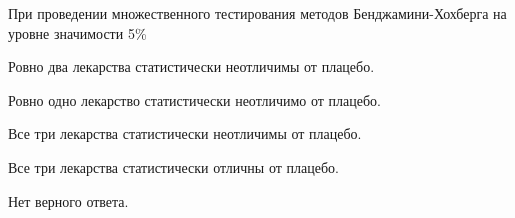 \documentclass[10pt, a4paper]{exam}
\begin{document}
\begin{questions}
		\question При проведении множественного тестирования методов Бенджамини-Хохберга на уровне значимости 5\%
		\begin{choices}
			\item Ровно два лекарства статистически неотличимы от плацебо.
			\item Ровно одно лекарство статистически неотличимо от плацебо.
			\item Все три лекарства статистически неотличимы от плацебо.
			\item Все три лекарства статистически отличны от плацебо.
			\item Нет верного ответа.
		\end{choices}
	\end{questions}
	
\end{document}
